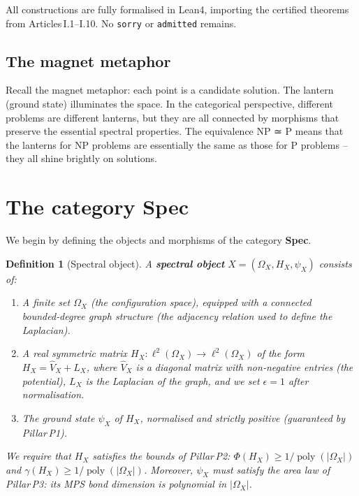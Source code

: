 \documentclass[11pt,a4paper]{article}
\newtheorem{definition}[theorem]{Definition}
\begin{document}
All constructions are fully formalised in Lean4, importing the certified theorems from Articles I.1–I.10. No \texttt{sorry} or \texttt{admitted} remains.

\subsection{The magnet metaphor}

Recall the magnet metaphor: each point is a candidate solution. The lantern (ground state) illuminates the space. In the categorical perspective, different problems are different lanterns, but they are all connected by morphisms that preserve the essential spectral properties. The equivalence NP ≃ P means that the lanterns for NP problems are essentially the same as those for P problems – they all shine brightly on solutions.

\section{The category Spec}

We begin by defining the objects and morphisms of the category \textbf{Spec}.

\begin{definition}[Spectral object]
A \textbf{spectral object} $X = (\Omega_X, H_X, \psi_X)$ consists of:
\begin{enumerate}
\item A finite set $\Omega_X$ (the configuration space), equipped with a connected bounded‑degree graph structure (the adjacency relation used to define the Laplacian).
\item A real symmetric matrix $H_X: \ell^2(\Omega_X) \to \ell^2(\Omega_X)$ of the form $H_X = \hat{V}_X + L_X$, where $\hat{V}_X$ is a diagonal matrix with non‑negative entries (the potential), $L_X$ is the Laplacian of the graph, and we set $\epsilon = 1$ after normalisation.
\item The ground state $\psi_X$ of $H_X$, normalised and strictly positive (guaranteed by Pillar P1).
\end{enumerate}
We require that $H_X$ satisfies the bounds of Pillar P2: $\Phi(H_X) \ge 1/\operatorname{poly}(|\Omega_X|)$ and $\gamma(H_X) \ge 1/\operatorname{poly}(|\Omega_X|)$. Moreover, $\psi_X$ must satisfy the area law of Pillar P3: its MPS bond dimension is polynomial in $|\Omega_X|$.
\end{definition}
\end{document}
